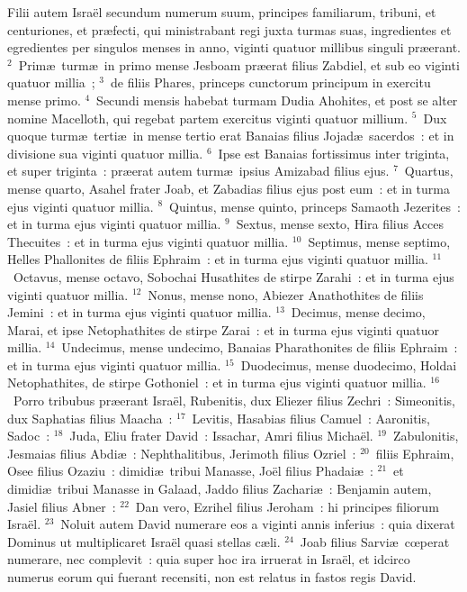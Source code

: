 \lettrine[lines=3,image=true,loversize=0.05,lraise=-0.03]{F}{}ilii autem Isra\"el secundum numerum suum, principes familiarum, tribuni, et centuriones, et pr\ae fecti, qui ministrabant regi juxta turmas suas, ingredientes et egredientes per singulos menses in anno, viginti quatuor millibus singuli pr\ae erant.
${}^{2}$~Prim\ae\ turm\ae\ in primo mense Jesboam pr\ae erat filius Zabdiel, et sub eo viginti quatuor millia~;
${}^{3}$~de filiis Phares, princeps cunctorum principum in exercitu mense primo.
${}^{4}$~Secundi mensis habebat turmam Dudia Ahohites, et post se alter nomine Macelloth, qui regebat partem exercitus viginti quatuor millium.
${}^{5}$~Dux quoque turm\ae\ terti\ae\ in mense tertio erat Banaias filius Jojad\ae\ sacerdos~: et in divisione sua viginti quatuor millia.
${}^{6}$~Ipse est Banaias fortissimus inter triginta, et super triginta~: pr\ae erat autem turm\ae\ ipsius Amizabad filius ejus.
${}^{7}$~Quartus, mense quarto, Asahel frater Joab, et Zabadias filius ejus post eum~: et in turma ejus viginti quatuor millia.
${}^{8}$~Quintus, mense quinto, princeps Samaoth Jezerites~: et in turma ejus viginti quatuor millia.
${}^{9}$~Sextus, mense sexto, Hira filius Acces Thecuites~: et in turma ejus viginti quatuor millia.
${}^{10}$~Septimus, mense septimo, Helles Phallonites de filiis Ephraim~: et in turma ejus viginti quatuor millia.
${}^{11}$~Octavus, mense octavo, Sobochai Husathites de stirpe Zarahi~: et in turma ejus viginti quatuor millia.
${}^{12}$~Nonus, mense nono, Abiezer Anathothites de filiis Jemini~: et in turma ejus viginti quatuor millia.
${}^{13}$~Decimus, mense decimo, Marai, et ipse Netophathites de stirpe Zarai~: et in turma ejus viginti quatuor millia.
${}^{14}$~Undecimus, mense undecimo, Banaias Pharathonites de filiis Ephraim~: et in turma ejus viginti quatuor millia.
${}^{15}$~Duodecimus, mense duodecimo, Holdai Netophathites, de stirpe Gothoniel~: et in turma ejus viginti quatuor millia.
${}^{16}$~Porro tribubus pr\ae erant Isra\"el, Rubenitis, dux Eliezer filius Zechri~: Simeonitis, dux Saphatias filius Maacha~:
${}^{17}$~Levitis, Hasabias filius Camuel~: Aaronitis, Sadoc~:
${}^{18}$~Juda, Eliu frater David~: Issachar, Amri filius Micha\"el.
${}^{19}$~Zabulonitis, Jesmaias filius Abdi\ae~: Nephthalitibus, Jerimoth filius Ozriel~:
${}^{20}$~filiis Ephraim, Osee filius Ozaziu~: dimidi\ae\ tribui Manasse, Jo\"el filius Phadai\ae~:
${}^{21}$~et dimidi\ae\ tribui Manasse in Galaad, Jaddo filius Zachari\ae~: Benjamin autem, Jasiel filius Abner~:
${}^{22}$~Dan vero, Ezrihel filius Jeroham~: hi principes filiorum Isra\"el.
${}^{23}$~Noluit autem David numerare eos a viginti annis inferius~: quia dixerat Dominus ut multiplicaret Isra\"el quasi stellas c\ae li.
${}^{24}$~Joab filius Sarvi\ae\ cœperat numerare, nec complevit~: quia super hoc ira irruerat in Isra\"el, et idcirco numerus eorum qui fuerant recensiti, non est relatus in fastos regis David.


